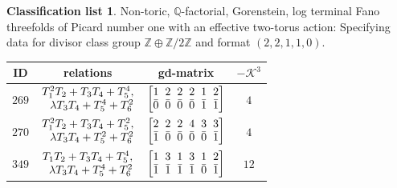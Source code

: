 \documentclass[10pt,a4paper]{amsart}
\theoremstyle{definition}
\newtheorem{class-list}[thm]{Classification list}
\def\ZZ{{\mathbb Z}}
\def\QQ{{\mathbb Q}}
\numberwithin{equation}{section}
\begin{document}
\begin{class-list}
Non-toric, $\QQ$-factorial, Gorenstein, log terminal Fano
threefolds of Picard number one with an effective two-torus action:
Specifying data for divisor class group $\ZZ\oplus \ZZ/2\ZZ$ and
format $(2,2,1,1,0)$.
\begin{table}[h!]\centering\setlength{\tabcolsep}{6.5pt}
\renewcommand{\arraystretch}{1.3}\small\tabulinesep=1mm
\begin{tabu}{c|c|c|c}
\hline
ID&relations&gd-matrix&$-\mathcal{K}^3$
\\
\hline
${269}$&
$\setlength{\arraycolsep}{1pt}\begin{array}{r}{T_{1}^{2}T_{2}+T_{3}T_{4}+T_{5}^{4}},\\ {\lambda T_{3}T_{4}+T_{5}^{4}+T_{6}^{2}}\end{array}$
&$\arraycolsep=1mm\begin{bmatrix}{1} & {2} & {2} & {2} & {1} & {2} \\ {\bar{0}} & {\bar{0}} & {\bar{0}} & {\bar{0}} & {\bar{1}} & {\bar{1}}\end{bmatrix}$&${4}$
\\
\hline
${270}$&
$\setlength{\arraycolsep}{1pt}\begin{array}{r}{T_{1}^{2}T_{2}+T_{3}T_{4}+T_{5}^{2}},\\ {\lambda T_{3}T_{4}+T_{5}^{2}+T_{6}^{2}}\end{array}$
&$\arraycolsep=1mm\begin{bmatrix}{2} & {2} & {2} & {4} & {3} & {3} \\ {\bar{1}} & {\bar{0}} & {\bar{0}} & {\bar{0}} & {\bar{0}} & {\bar{1}}\end{bmatrix}$&${4}$
\\
\hline
${349}$&
$\setlength{\arraycolsep}{1pt}\begin{array}{r}{T_{1}T_{2}+T_{3}T_{4}+T_{5}^{4}},\\ {\lambda T_{3}T_{4}+T_{5}^{4}+T_{6}^{2}}\end{array}$
&$\arraycolsep=1mm\begin{bmatrix}{1} & {3} & {1} & {3} & {1} & {2} \\ {\bar{1}} & {\bar{1}} & {\bar{1}} & {\bar{1}} & {\bar{0}} & {\bar{1}}\end{bmatrix}$&${12}$
\\
\hline
\end{tabu}%
\end{table}
\end{class-list}
\end{document}
